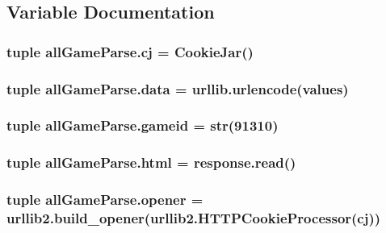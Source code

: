 \subsection{Variable Documentation}
\hypertarget{namespaceall_game_parse_a0edb49935fe4f03afaeda24b26701cac}{
\subsubsection[{cj}]{\setlength{\rightskip}{0pt plus 5cm}tuple all\+Game\+Parse.\+cj = Cookie\+Jar()}}\label{namespaceall_game_parse_a0edb49935fe4f03afaeda24b26701cac}
\hypertarget{namespaceall_game_parse_a8b0c2752622015229ec7c131f733b221}{
\subsubsection[{data}]{\setlength{\rightskip}{0pt plus 5cm}tuple all\+Game\+Parse.\+data = urllib.\+urlencode({\bf values})}}\label{namespaceall_game_parse_a8b0c2752622015229ec7c131f733b221}
\hypertarget{namespaceall_game_parse_a1805ba57761718ea195891b56adac271}{
\subsubsection[{gameid}]{\setlength{\rightskip}{0pt plus 5cm}tuple all\+Game\+Parse.\+gameid = str(91310)}}\label{namespaceall_game_parse_a1805ba57761718ea195891b56adac271}
\hypertarget{namespaceall_game_parse_a8dd688b6fdf0d5dc75fd1052e88199da}{
\subsubsection[{html}]{\setlength{\rightskip}{0pt plus 5cm}tuple all\+Game\+Parse.\+html = response.\+read()}}\label{namespaceall_game_parse_a8dd688b6fdf0d5dc75fd1052e88199da}
\hypertarget{namespaceall_game_parse_a1cefe9996713674c46f624baa334280d}{
\subsubsection[{opener}]{\setlength{\rightskip}{0pt plus 5cm}tuple all\+Game\+Parse.\+opener = urllib2.\+build\+\_\+opener(urllib2.\+H\+T\+T\+P\+Cookie\+Processor({\bf cj}))}}\label{namespaceall_game_parse_a1cefe9996713674c46f624baa334280d}
